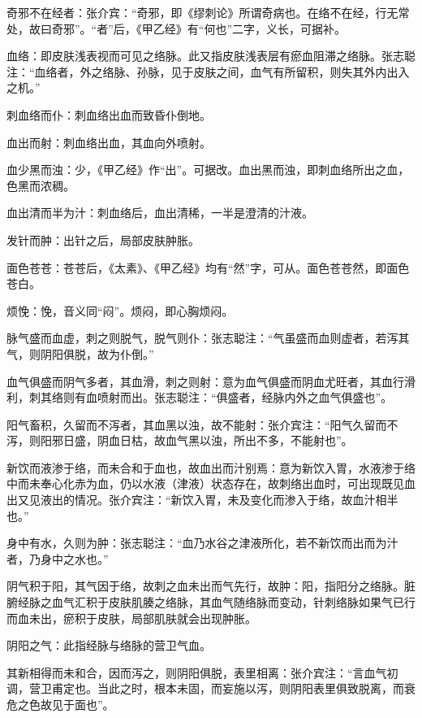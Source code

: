 \documentclass[12pt]{ctexbook}%
\begin{document}

\begin{jiaozhu}
  \item 奇邪不在经者：张介宾：“奇邪，即《缪刺论》所谓奇病也。在络不在经，行无常处，故曰奇邪”。“者”后，《甲乙经》有“何也”二字，义长，可据补。
  \item 血络：即皮肤浅表视而可见之络脉。此又指皮肤浅表层有瘀血阻滞之络脉。张志聪注：“血络者，外之络脉、孙脉，见于皮肤之间，血气有所留积，则失其外内出入之机。”
  \item 刺血络而仆：刺血络出血而致昏仆倒地。
  \item 血出而射：刺血络出血，其血向外喷射。
  \item 血少黑而浊：少，《甲乙经》作“出”。可据改。血出黑而浊，即刺血络所出之血，色黑而浓稠。
  \item 血出清而半为汁：刺血络后，血出清稀，一半是澄清的汁液。
  \item 发针而肿：出针之后，局部皮肤肿胀。
  \item 面色苍苍：苍苍后，《太素》、《甲乙经》均有“然”字，可从。面色苍苍然，即面色苍白。
  \item 烦悗：悗，音义同“闷”。烦闷，即心胸烦闷。
  \item 脉气盛而血虚，刺之则脱气，脱气则仆：张志聪注：“气虽盛而血则虚者，若泻其气，则阴阳俱脱，故为仆倒。”
  \item 血气俱盛而阴气多者，其血滑，刺之则射：意为血气俱盛而阴血尤旺者，其血行滑利，刺其络则有血喷射而出。张志聪注：“俱盛者，经脉内外之血气俱盛也”。
  \item 阳气畜积，久留而不泻者，其血黑以浊，故不能射：张介宾注：“阳气久留而不泻，则阳邪日盛，阴血日枯，故血气黑以浊，所出不多，不能射也”。
  \item 新饮而液渗于络，而未合和于血也，故血出而汁别焉：意为新饮入胃，水液渗于络中而未奉心化赤为血，仍以水液（津液）状态存在，故刺络出血时，可出现既见血出又见液出的情况。张介宾注：“新饮入胃，未及变化而渗入于络，故血汁相半也。”
  \item 身中有水，久则为肿：张志聪注：“血乃水谷之津液所化，若不新饮而出而为汁者，乃身中之水也。”
  \item 阴气积于阳，其气因于络，故刺之血未出而气先行，故肿：阳，指阳分之络脉。脏腑经脉之血气汇积于皮肤肌腠之络脉，其血气随络脉而变动，针刺络脉如果气已行而血未出，瘀积于皮肤，局部肌肤就会出现肿胀。
  \item 阴阳之气：此指经脉与络脉的营卫气血。
  \item 其新相得而未和合，因而泻之，则阴阳俱脱，表里相离：张介宾注：“言血气初调，营卫甫定也。当此之时，根本未固，而妄施以泻，则阴阳表里俱致脱离，而衰危之色故见于面也”。

\end{jiaozhu}
\end{document}
